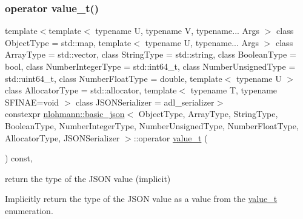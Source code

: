 \subsubsection{\texorpdfstring{operator value\_t()}{operator value\_t()}}
{\footnotesize\ttfamily template$<$template$<$ typename U, typename V, typename... Args $>$ class Object\+Type = std\+::map, template$<$ typename U, typename... Args $>$ class Array\+Type = std\+::vector, class String\+Type  = std\+::string, class Boolean\+Type  = bool, class Number\+Integer\+Type  = std\+::int64\+\_\+t, class Number\+Unsigned\+Type  = std\+::uint64\+\_\+t, class Number\+Float\+Type  = double, template$<$ typename U $>$ class Allocator\+Type = std\+::allocator, template$<$ typename T, typename S\+F\+I\+N\+A\+E=void $>$ class J\+S\+O\+N\+Serializer = adl\+\_\+serializer$>$ \\
constexpr \mbox{\hyperlink{classnlohmann_1_1basic__json}{nlohmann\+::basic\+\_\+json}}$<$ Object\+Type, Array\+Type, String\+Type, Boolean\+Type, Number\+Integer\+Type, Number\+Unsigned\+Type, Number\+Float\+Type, Allocator\+Type, J\+S\+O\+N\+Serializer $>$\+::operator \mbox{\hyperlink{namespacenlohmann_1_1detail_a90aa5ef615aa8305e9ea20d8a947980f}{value\+\_\+t}} (\begin{DoxyParamCaption}{ }\end{DoxyParamCaption}) const\hspace{0.3cm}{\ttfamily [inline]}, {\ttfamily [noexcept]}}



return the type of the J\+S\+ON value (implicit) 

Implicitly return the type of the J\+S\+ON value as a value from the \mbox{\hyperlink{classnlohmann_1_1basic__json_ae8cbef097f7da18a781fc86587de6b90}{value\+\_\+t}} enumeration.

